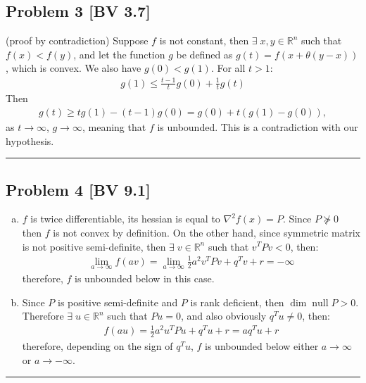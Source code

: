\documentclass[12pt, letterpaper, twoside]{article}
\newcommand{\R}{\mathbb{R}}
\DeclareMathOperator{\Null}{null}
\begin{document}
\subsection*{Problem 3 \small[BV 3.7]}
(proof by contradiction) Suppose $f$ is not constant, then $\exists\; x,y\in\R^n$ such that $f(x)<f(y)$, and let the function $g$ be defined as $g(t)=f(x+\theta(y-x))$, which is convex. We also have $g(0)<g(1)$. For all $t>1$:
\begin{align*}
    g(1)\leq\frac{t-1}{t}g(0)+\frac{1}{t}g(t)
\end{align*}
Then 
\begin{align*}
    g(t)\geq tg(1)-(t-1)g(0)=g(0)+t(g(1)-g(0)),
\end{align*}
as $t\rightarrow\infty$, $g\rightarrow\infty$, meaning that $f$ is unbounded. This is a contradiction with our hypothesis.\\
\hrule


\subsection*{Problem 4 \small[BV 9.1]} 
\begin{enumerate}[(a)]
    \item $f$ is twice differentiable, its hessian is equal to $\nabla^2f(x)=P$. Since $P\nsucceq0$ then $f$ is not convex by definition. On the other hand, since symmetric matrix is not positive semi-definite, then $\exists\; v\in\R^n$ such that $v^TPv<0$, then:
    \begin{align*}
        \lim_{a\rightarrow \infty}f(av)=\lim_{a\rightarrow \infty}\frac{1}{2}a^2v^TPv+q^Tv+r=-\infty
    \end{align*}
    therefore, $f$ is unbounded below in this case.

    \item Since $P$ is positive semi-definite and $P$ is rank deficient, then $\dim\Null P>0$. Therefore $\exists\; u\in\R^n$ such that $Pu=0$, and also obviously $q^Tu\neq0$, then:
    \begin{align*}
        f(au)=\frac{1}{2}a^2u^TPu+q^Tu+r=aq^Tu+r
    \end{align*}
    therefore, depending on the sign of $q^Tu$, $f$ is unbounded below either $a\rightarrow\infty$ or $a\rightarrow-\infty$.
\end{enumerate}
\hrule
\end{document}
